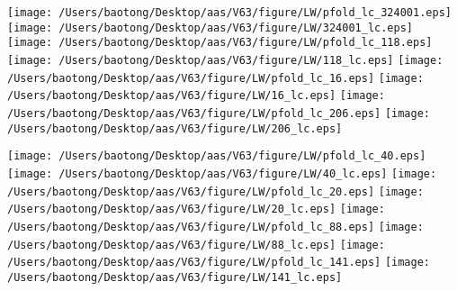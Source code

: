 \documentclass{aastex63}
\begin{document}
\begin{figure*}[!ht]
\centering
\texttt{[image: /Users/baotong/Desktop/aas/V63/figure/LW/pfold\_lc\_324001.eps]}
\hfill
\texttt{[image: /Users/baotong/Desktop/aas/V63/figure/LW/324001\_lc.eps]}
\hfill
{}
\texttt{[image: /Users/baotong/Desktop/aas/V63/figure/LW/pfold\_lc\_118.eps]}
\hfill
\texttt{[image: /Users/baotong/Desktop/aas/V63/figure/LW/118\_lc.eps]}
\hfill
{}
\texttt{[image: /Users/baotong/Desktop/aas/V63/figure/LW/pfold\_lc\_16.eps]}
\hfill
\texttt{[image: /Users/baotong/Desktop/aas/V63/figure/LW/16\_lc.eps]}
\hfill
{}
\texttt{[image: /Users/baotong/Desktop/aas/V63/figure/LW/pfold\_lc\_206.eps]}
\hfill
\texttt{[image: /Users/baotong/Desktop/aas/V63/figure/LW/206\_lc.eps]}
\hfill
{}
\end{figure*}
\clearpage
\begin{figure*}[!ht]
\centering
\texttt{[image: /Users/baotong/Desktop/aas/V63/figure/LW/pfold\_lc\_40.eps]}
\hfill
\texttt{[image: /Users/baotong/Desktop/aas/V63/figure/LW/40\_lc.eps]}
\hfill
{}
\texttt{[image: /Users/baotong/Desktop/aas/V63/figure/LW/pfold\_lc\_20.eps]}
\hfill
\texttt{[image: /Users/baotong/Desktop/aas/V63/figure/LW/20\_lc.eps]}
\hfill
{}
\texttt{[image: /Users/baotong/Desktop/aas/V63/figure/LW/pfold\_lc\_88.eps]}
\hfill
\texttt{[image: /Users/baotong/Desktop/aas/V63/figure/LW/88\_lc.eps]}
\hfill
{}
\texttt{[image: /Users/baotong/Desktop/aas/V63/figure/LW/pfold\_lc\_141.eps]}
\hfill
\texttt{[image: /Users/baotong/Desktop/aas/V63/figure/LW/141\_lc.eps]}
\hfill
{}
\end{figure*}
\end{document}
